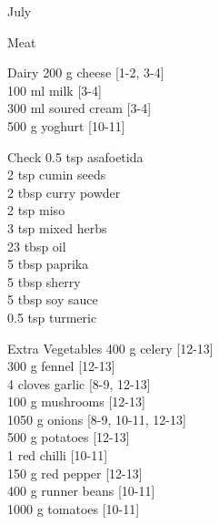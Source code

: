 \begin{menu}{July}
\begin{shoppinglist}{Meat}
      \end{shoppinglist}%
      \begin{shoppinglist}{Dairy}
      200 g cheese {\scriptsize[1-2, 3-4]}\\
      100 ml milk {\scriptsize[3-4]}\\
      300 ml soured cream {\scriptsize[3-4]}\\
      500 g yoghurt {\scriptsize[10-11]}\\
      \end{shoppinglist}%
      \par\vfil %
      \vfil\clearpage %
      \begin{shoppinglist}{Check}
      0.5 tsp asafoetida \\
      2 tsp cumin seeds \\
      2 tbsp curry powder \\
      2 tsp miso \\
      3 tsp mixed herbs \\
      23 tbsp oil \\
      5 tbsp paprika \\
      5 tbsp sherry \\
      5 tbsp soy sauce \\
      0.5 tsp turmeric \\
      \end{shoppinglist}%
      \begin{shoppinglist}{Extra Vegetables}
      400 g celery {\scriptsize[12-13]}\\
      300 g fennel {\scriptsize[12-13]}\\
      4 cloves garlic {\scriptsize[8-9, 12-13]}\\
      100 g mushrooms {\scriptsize[12-13]}\\
      1050 g onions {\scriptsize[8-9, 10-11, 12-13]}\\
      500 g potatoes {\scriptsize[12-13]}\\
      1  red chilli {\scriptsize[10-11]}\\
      150 g red pepper {\scriptsize[12-13]}\\
      400 g runner beans {\scriptsize[10-11]}\\
      1000 g tomatoes {\scriptsize[10-11]}\\
      \end{shoppinglist}%
      \par\vfil %
    \vfil\clearpage
  

\end{menu}
